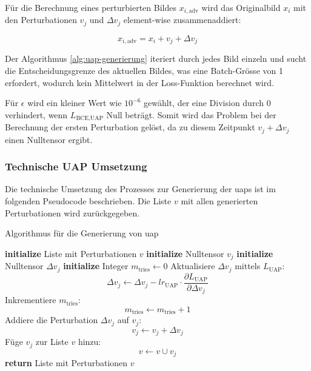 Für die Berechnung eines perturbierten Bildes $x_{i,\text{adv}}$ wird das Originalbild $x_i$ mit den Perturbationen $v_j$ und $\Delta v_j$ element-wise zusammenaddiert: 

\begin{equation}
    x_{i,\text{adv}} = x_i + v_j + \Delta v_j
    \label{eq:xadv}
\end{equation}

Der Algorithmus \ref{alg:uap-generierung} iteriert durch jedes Bild einzeln und sucht die Entscheidungsgrenze des aktuellen Bildes, was eine Batch-Grösse von 1 erfordert, wodurch kein Mittelwert in der Loss-Funktion berechnet wird.

Für $\epsilon$ wird ein kleiner Wert wie $10^{-6}$ gewählt, der eine Division durch 0 verhindert, wenn $L_{\text{BCE,UAP}}$ Null beträgt. Somit wird das Problem bei der Berechnung der ersten Perturbation gelöst, da zu diesem Zeitpunkt $v_j + \Delta v_j$ einen Nulltensor ergibt. 

\newpage

\subsubsection{Technische UAP Umsetzung} \label{chap:technische_umsetzung_uap}
Die technische Umsetzung des Prozesses zur Generierung der \acrshort{uap}s ist im folgenden Pseudocode beschrieben. Die Liste $v$ mit allen generierten Perturbationen wird zurückgegeben.

\begin{algorithm}[H]
\caption{Algorithmus für die Generierung von \acrlong{uap}}
\begin{algorithmic}[1]
\label{algo:UAP Algorithmus}
\STATE \textbf{initialize} Liste mit Perturbationen $v$
    \STATE \textbf{initialize} Nulltensor $v_j$
        \STATE \textbf{initialize} Nulltensor $\Delta v_j$
        \STATE \textbf{initialize} Integer $m_{\text{tries}} \gets 0$
            \STATE Aktualisiere $\Delta v_j$ mittels $L_{\text{UAP}}$: $$\Delta v_j \gets \Delta v_j - lr_{\text{UAP}} \cdot \frac{\partial L_{\text{UAP}}}{\partial \Delta v_j}$$
            \STATE Inkrementiere $m_{\text{tries}}$: $$m_{\text{tries}} \gets m_{\text{tries}} + 1$$
            \ENDWHILE
                \STATE Addiere die Perturbation $\Delta v_j$ auf $v_j$: $$v_j \leftarrow v_j + \Delta v_j$$
            \ENDIF
        \ENDFOR
    \ENDWHILE
    \STATE Füge $v_j$ zur Liste $v$ hinzu:
    $$v \leftarrow v \cup {v_j}$$
\ENDFOR
\STATE \textbf{return} Liste mit Perturbationen $v$
\end{algorithmic}
\label{alg:uap-generierung}
\end{algorithm}

